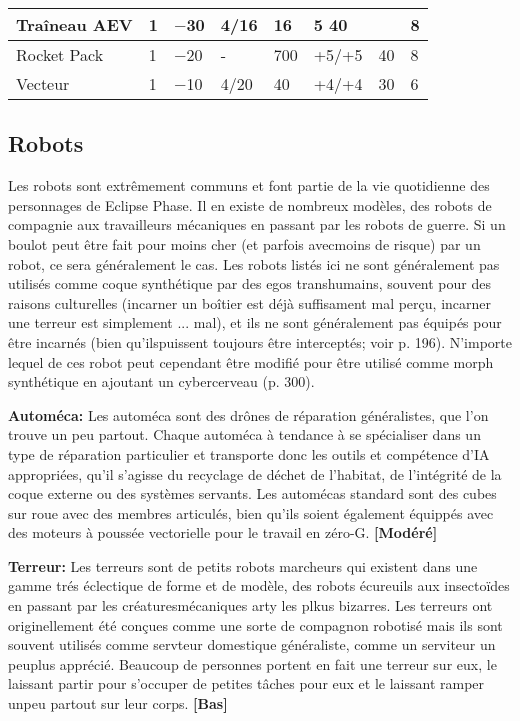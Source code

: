 {\begin{table}
\begin{tabularx}{\textwidth}{|l|X|X|X|X|X|X|X|}
Traîneau AEV	&1	&$-$30	&4/16	&16	&5 40	&&8 \\ \hline

Rocket Pack	&1	&$-$20	&- &700	&+5/+5	&40	&8 \\ \hline

Vecteur	&1	&$-$10	&4/20	&40	&+4/+4	&30	&6 \\ \hline

\end{tabularx} \label{tab:groundcraft-personal} \end{table} 



\subsection{Robots} \label{sec:robots} 

Les robots sont extrêmement communs et font partie de la vie quotidienne des personnages de  Eclipse Phase. Il en existe de nombreux modèles, des robots de compagnie aux travailleurs mécaniques en passant par les robots de guerre. Si un boulot peut être fait pour moins cher (et parfois avecmoins de risque) par un robot, ce sera généralement le cas. Les robots listés ici ne sont généralement pas utilisés comme coque synthétique par des egos transhumains, souvent pour des raisons culturelles (incarner un boîtier est déjà suffisament mal perçu, incarner une terreur est simplement ... mal), et ils ne sont généralement pas équipés pour être incarnés (bien qu'ilspuissent toujours être interceptés; voir p. 196). N'importe lequel de ces robot peut cependant être modifié pour être utilisé comme morph synthétique en ajoutant un cybercerveau (p. 300). 

\textbf{Automéca:} Les automéca sont des drônes de réparation généralistes, que l'on trouve un peu partout. Chaque automéca à tendance à se spécialiser dans un type de réparation particulier et transporte donc les outils et compétence d'IA appropriées, qu'il s'agisse du recyclage de déchet de l'habitat, de l'intégrité de la coque externe ou des systèmes servants. Les automécas standard sont des cubes sur roue avec des membres articulés, bien qu'ils soient également équippés avec des moteurs à poussée vectorielle pour le travail en zéro-G. \textbf{[Modéré]} 

\textbf{Terreur:} Les terreurs sont de petits robots marcheurs qui existent dans une gamme trés éclectique de forme et de modèle, des robots écureuils aux insectoïdes en passant par les créaturesmécaniques arty les plkus bizarres. Les terreurs ont originellement été conçues comme une sorte de compagnon robotisé mais ils sont souvent utilisés comme servteur domestique généraliste, comme un serviteur un peuplus apprécié. Beaucoup de personnes portent en fait une terreur sur eux, le laissant partir pour s'occuper de petites tâches pour eux et le laissant ramper unpeu partout sur leur corps. \textbf{[Bas]} 

}
